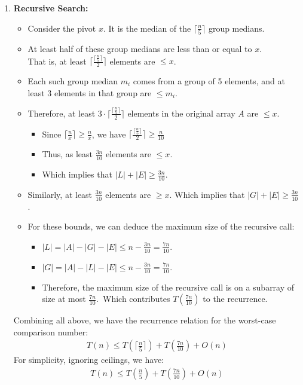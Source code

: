 \documentclass[11pt, a4paper, oneside]{memoir}
\begin{document}
\begin{enumerate}
    \item \textbf{Recursive Search:}
          \begin{itemize}
              \item Consider the pivot $x$. It is the median of the $\lceil \frac{n}{5} \rceil$ group medians.
              \item At least half of these group medians are less than or equal to $x$.\\
                    That is, at least $\lceil \frac{\lceil \frac{n}{5} \rceil}{2} \rceil$ elements are $\leq x$.
              \item Each such group median $m_i$ comes from a group of 5 elements, and at least 3 elements in that group are $\leq m_i$.
              \item Therefore, at least $3 \cdot \lceil \frac{\lceil \frac{n}{5} \rceil}{2} \rceil$ elements in the original array $A$ are $\leq x$.
                    \begin{itemize}
                        \item Since $\lceil \frac{n}{x} \rceil \geq \frac{n}{x}$, we have $\lceil \frac{\lceil \frac{n}{5} \rceil}{2} \rceil \geq \frac{n}{10}$
                        \item Thus, as least $\frac{3n}{10}$ elements are $\leq x$.
                        \item Which implies that $|L| + |E| \ge \frac{3n}{10}$.
                    \end{itemize}
              \item Similarly, at least $\frac{3n}{10}$ elements are $\geq x$. Which implies that $|G| + |E| \ge \frac{3n}{10}$.
              \item For these bounds, we can deduce the maximum size of the recursive call:
                    \begin{itemize}
                        \item $|L| = |A| - |G| - |E| \leq n - \frac{3n}{10} = \frac{7n}{10}$.
                        \item $|G| = |A| - |L| - |E| \leq n - \frac{3n}{10} = \frac{7n}{10}$.
                        \item Therefore, the maximum size of the recursive call is on a subarray of size at most $\frac{7n}{10}$.\
                              Which contributes $T(\frac{7n}{10})$ to the recurrence.
                    \end{itemize}
          \end{itemize}
          Combining all above, we have the recurrence relation for the worst-case comparison number:
          \begin{align*}
              T(n) \leq T(\lceil \frac{n}{5} \rceil) + T(\frac{7n}{10}) + O(n)
          \end{align*}
          For simplicity, ignoring ceilings, we have:
          \begin{align*}
              T(n) \leq T(\frac{n}{5}) + T(\frac{7n}{10}) + O(n)
          \end{align*}
\end{enumerate}
\end{document}
